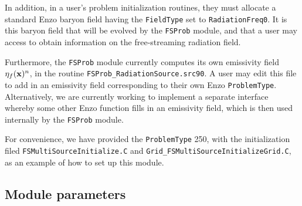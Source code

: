 \documentclass[letterpaper,10pt]{article}
\renewcommand{\(}{\left(}
\renewcommand{\)}{\right)}
\newcommand{\xvec}{{\bf x}}
\begin{document}
In addition, in a user's problem initialization routines, they must
allocate a standard Enzo baryon field having the {\tt FieldType} set
to {\tt RadiationFreq0}.  It is this baryon field that will be evolved
by the {\tt FSProb} module, and that a user may access to obtain
information on the free-streaming radiation field.

Furthermore, the {\tt FSProb} module currently computes its own
emissivity field $\eta_f(\xvec)^n$, in the routine 
{\tt FSProb\_RadiationSource.src90}.  A user may edit this file to add
in an emissivity field corresponding to their own Enzo 
{\tt ProblemType}.  Alternatively, we are currently working to
implement a separate interface whereby some other Enzo function fills
in an emissivity field, which is then used internally by the 
{\tt FSProb} module.

For convenience, we have provided the {\tt ProblemType} 250, with the
initialization filed {\tt FSMultiSourceInitialize.C} and 
{\tt Grid\_FSMultiSourceInitializeGrid.C}, as an example of how to set
up this module.



\subsection{Module parameters}
\end{document}
